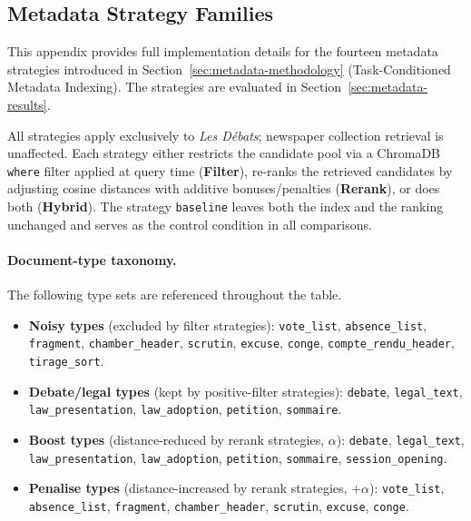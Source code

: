 \subsection{Metadata Strategy Families}
\label{sec:appendix-metadata-families}

This appendix provides full implementation details for the fourteen metadata
strategies introduced in Section~\ref{sec:metadata-methodology}
(Task-Conditioned Metadata Indexing).
The strategies are evaluated in Section~\ref{sec:metadata-results}.

All strategies apply exclusively to \textit{Les Débats}; newspaper collection
retrieval is unaffected.
Each strategy either restricts the candidate pool via a ChromaDB \texttt{where}
filter applied at query time (\textbf{Filter}), re-ranks the retrieved
candidates by adjusting cosine distances with additive bonuses/penalties
(\textbf{Rerank}), or does both (\textbf{Hybrid}).
The strategy \texttt{baseline} leaves both the index and the ranking unchanged
and serves as the control condition in all comparisons.

\paragraph{Document-type taxonomy.}
The following type sets are referenced throughout the table.

\begin{itemize}[leftmargin=1.5em, itemsep=2pt]
  \item \textbf{Noisy types} (excluded by filter strategies):
    \texttt{vote\_list}, \texttt{absence\_list}, \texttt{fragment},
    \texttt{chamber\_header}, \texttt{scrutin}, \texttt{excuse},
    \texttt{conge}, \texttt{compte\_rendu\_header}, \texttt{tirage\_sort}.

  \item \textbf{Debate/legal types} (kept by positive-filter strategies):
    \texttt{debate}, \texttt{legal\_text}, \texttt{law\_presentation},
    \texttt{law\_adoption}, \texttt{petition}, \texttt{sommaire}.

  \item \textbf{Boost types} (distance-reduced by rerank strategies, $\alpha$):
    \texttt{debate}, \texttt{legal\_text}, \texttt{law\_presentation},
    \texttt{law\_adoption}, \texttt{petition}, \texttt{sommaire},
    \texttt{session\_opening}.

  \item \textbf{Penalise types} (distance-increased by rerank strategies, $+\alpha$):
    \texttt{vote\_list}, \texttt{absence\_list}, \texttt{fragment},
    \texttt{chamber\_header}, \texttt{scrutin}, \texttt{excuse},
    \texttt{conge}.
\end{itemize}

